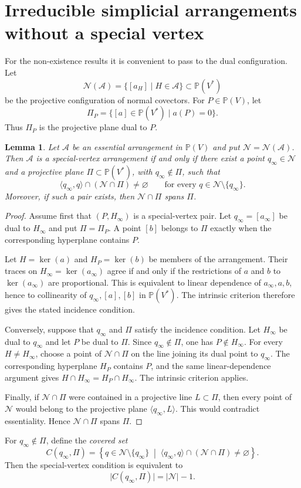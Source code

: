 \documentclass[11pt]{article}
\newtheorem{lemma}[theorem]{Lemma}
\theoremstyle{definition}
\theoremstyle{remark}
\newcommand{\PP}{\mathbb P}
\newcommand{\cA}{\mathcal A}
\newcommand{\cN}{\mathcal N}
\newcommand{\card}[1]{\lvert #1\rvert}
\begin{document}
\section{Irreducible simplicial arrangements without a special vertex}
\label{sec:negative}
For the non-existence results it is convenient to pass to the dual configuration. Let
\[
 \cN(\cA)=\{[a_H]\mid H\in\cA\}\subset\PP(V^*)
\]
be the projective configuration of normal covectors.  For
$P\in\PP(V)$, let
\[
 \Pi_P=\{[a]\in\PP(V^*)\mid a(P)=0\}.
\]
Thus $\Pi_P$ is the projective plane dual to $P$.

\begin{lemma}
\label{lem:dual-special-vertex}
Let $\cA$ be an essential arrangement in $\PP(V)$ and put
$\cN=\cN(\cA)$.  Then $\cA$ is a special-vertex arrangement if and only if
there exist a point $q_\infty\in\cN$ and a projective plane
$\Pi\subset\PP(V^*)$, with $q_\infty\notin\Pi$, such that
\[
 \langle q_\infty,q\rangle\cap(\cN\cap\Pi)\neq\varnothing
 \qquad
 \text{for every }q\in\cN\setminus\{q_\infty\}.
\]
Moreover, if such a pair exists, then $\cN\cap\Pi$ spans $\Pi$.
\end{lemma}

\begin{proof}
Assume first that $(P,H_\infty)$ is a special-vertex pair.  Let
$q_\infty=[a_\infty]$ be dual to $H_\infty$ and put $\Pi=\Pi_P$.  A point
$[b]$ belongs to $\Pi$ exactly when the corresponding hyperplane contains
$P$.

Let $H=\ker(a)$ and $H_P=\ker(b)$ be members of the arrangement.  Their
traces on $H_\infty=\ker(a_\infty)$ agree if and only if the restrictions
of $a$ and $b$ to $\ker(a_\infty)$ are proportional.  This is equivalent
to linear dependence of $a_\infty,a,b$, hence to collinearity of
$q_\infty,[a],[b]$ in $\PP(V^*)$.  The intrinsic criterion therefore gives
the stated incidence condition.

Conversely, suppose that $q_\infty$ and $\Pi$ satisfy the incidence
condition.  Let $H_\infty$ be dual to $q_\infty$ and let $P$ be dual to
$\Pi$.  Since $q_\infty\notin\Pi$, one has $P\notin H_\infty$.  For every
$H\neq H_\infty$, choose a point of $\cN\cap\Pi$ on the line joining its
dual point to $q_\infty$.  The corresponding hyperplane $H_P$ contains
$P$, and the same linear-dependence argument gives
$H\cap H_\infty=H_P\cap H_\infty$.  The intrinsic criterion applies.

Finally, if $\cN\cap\Pi$ were contained in a projective line $L\subset\Pi$,
then every point of $\cN$ would belong to the projective plane
$\langle q_\infty,L\rangle$.  This would contradict essentiality.  Hence
$\cN\cap\Pi$ spans $\Pi$.
\end{proof}
For $q_\infty\notin\Pi$, define the \emph{covered set}
\[
 C(q_\infty,\Pi)=
 \left\{q\in\cN\setminus\{q_\infty\}\;\middle|\;
 \langle q_\infty,q\rangle\cap(\cN\cap\Pi)\neq\varnothing\right\}.
\]
Then the special-vertex condition is equivalent to
\[
 \card{C(q_\infty,\Pi)}=\card{\cN}-1.
\]
\end{document}

